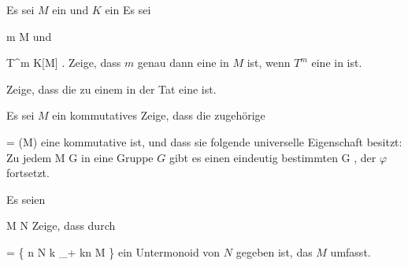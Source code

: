 {}
{





Es sei $M$ ein
und $K$ ein
Es sei

\mavergleichskette
{\vergleichskette
{ m
}
{ \in }{ M
}
{  }{
}
{    }{
}
{   }{
}
}
{}{}{}
und

\mavergleichskette
{\vergleichskette
{ T^m
}
{ \in }{ K[M]
}
{  }{
}
{    }{
}
{   }{
}
}
{}{}{.}
Zeige, dass $m$ genau dann eine
in $M$ ist, wenn $T^m$ eine
in
 ist.





}
{} {}

{}
{





Zeige, dass die
zu einem
in der Tat eine
ist.





}
{} {}

{}
{





Es sei $M$ ein kommutatives
Zeige, dass die zugehörige

\mavergleichskette
{\vergleichskette
{ \Gamma
}
{ = }{ \Gamma(M)
}
{  }{
}
{    }{
}
{   }{
}
}
{}{}{}
eine kommutative
ist, und dass sie folgende universelle Eigenschaft besitzt: Zu jedem
\maabbdisp {\varphi} { M } { G
} {}
in eine Gruppe $G$ gibt es einen eindeutig bestimmten
\maabbdisp {\tilde{\varphi}} {\Gamma} {G
} {,}
der $\varphi$ fortsetzt.





}
{} {}

{}
{





Es seien

\mavergleichskette
{\vergleichskette
{ M
}
{ \subseteq }{ N
}
{  }{
}
{    }{
}
{   }{
}
}
{}{}{}
Zeige, dass durch

\mavergleichskettedisp
{\vergleichskette
{ 
}
{ =} { \left\{ n \in N  \mid  {} k \in \N_+  kn \in M        \right\}
}
{ } {
}
{ } {
}
{ } {
}
}
{}{}{}
ein Untermonoid von $N$ gegeben ist, das $M$ umfasst.





}
{} {}

